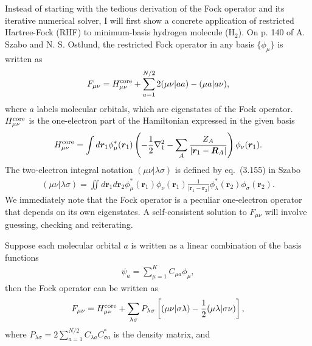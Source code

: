 \documentclass[draftthesis,fullpage]{uiucthesis}
\newcommand{\bs}{\boldsymbol}
\begin{document}
Instead of starting with the tedious derivation of the Fock operator and its iterative numerical solver, I will first show a concrete application of restricted Hartree-Fock (RHF) to minimum-basis hydrogen molecule (H$_2$). %
On p. 140 of A. Szabo and N. S. Ostlund, the restricted Fock operator in any basis $\{\phi_\mu\}$ is written as
\begin{align}
F_{\mu\nu} = H^{\text{core}}_{\mu\nu} + \sum\limits_{a=1}^{N/2} 2(\mu\nu|aa) - (\mu a|a\nu),
\end{align} %
where $a$ labels molecular orbitals, which are eigenstates of the Fock operator. $H^{\text{core}}_{\mu\nu}$ is the one-electron part of the Hamiltonian expressed in the given basis %
\begin{align} \label{eq:hf-hcore}
\hcore = \int d\bs{r}_1 \phi_\mu^*(\bs{r}_1)\left(
-\frac{1}{2}\nabla_1^2-\sum\limits_A \dfrac{Z_A}{\vert\bs{r}_1-\bs{R}_A\vert}
\right)  \phi_\nu(\bs{r}_1).
\end{align}
The two-electron integral notation $(\mu\nu|\lambda\sigma)$ is defined by eq.~(3.155) in Szabo
\begin{align} \label{eq:hf-eri}
(\mu\nu|\lambda\sigma) = \iint d\bs{r}_1 d\bs{r}_2 \phi_\mu^*(\bs{r}_1)\phi_{\nu}(\bs{r}_1)
\frac{1}{\vert\bs{r}_1-\bs{r}_2\vert}
\phi_\lambda^*(\bs{r}_2)\phi_\sigma(\bs{r}_2).
\end{align}
We immediately note that the Fock operator is a peculiar one-electron operator that depends on its own eigenstates. A self-consistent solution to $F_{\mu\nu}$ will involve guessing, checking and reiterating.

Suppose each molecular orbital $a$ is written as a linear combination of the basis functions
\begin{align}
\psi_a = \sum\limits_{\mu=1}^K C_{\mu a} \phi_\mu,
\end{align}
then the Fock operator can be written as
\begin{align}
F_{\mu\nu} = H^{\text{core}}_{\mu\nu} + \sum\limits_{\lambda\sigma} P_{\lambda\sigma} \left[
(\mu\nu|\sigma\lambda) - \frac{1}{2}(\mu\lambda|\sigma\nu)
\right],
\end{align} %
where $P_{\lambda\sigma}=2\sum_{a=1}^{N/2} C_{\lambda a}C_{\sigma a}^*$ is the density matrix, %
and 
\end{document}
